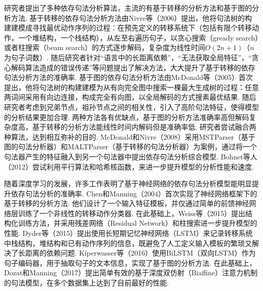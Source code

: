 研究者提出了多种依存句法分析算法，主流的有基于转移的分析方法和基于图的分析方法.
基于转移的依存句法分析方法由Nivre等（2006）提出，他将句法树的构建建模成寻找最优动作序列的过程：在预先定义的转移系统下（包括有限个转移动作，一个堆结构，一个栈结构），从左至右遍历句子，以贪心搜索（gready search）或者柱搜索（beam search）的方式逐步解码，复杂度为线性时间$O(2n+1)$（$n$为句子词数）.
随后研究者针对“语言中的长距离依赖”，“无法获取全局特征”，“贪心解码算法造成的错误传递”等问题提出了解决方法，大大提升了基于转移的依存句法分析方法的准确率.
基于图的依存句法分析方法由McDonald等（2005）首次提出，他将句法树的构建建模为从有向完全图中搜索一棵最大生成树的过程：任意两词间采用有向边连接，构成完全有向图，以全局解码的方式搜素最优结果. 随后研究者考虑到兄弟节点，祖孙节点之间的相关性，引入了高阶句法特征，使得模型的分析结果更加合理.
两种方法各有优缺点，基于图的分析方法准确率高但解码复杂度高，基于转移的分析方法能线性时间内解码但是准确率低. 研究者尝试融合两种算法，达到相互弥补的目的. McDonald和Nivre（2008）采用MSTParser（基于图的句法分析器）和MALTParser（基于转移的句法分析器）为案例，通过将一个句法器产生的特征融入到另一个句法器中提出依存句法分析综合模型. Bohnet等人（2012）尝试利用平行算法和哈希核函数，来进一步提升模型的分析性能和速度.

随着深度学习的发展，许多工作表明了基于神经网络的依存句法分析模型能明显提升依存句法分析的准确率.
Chen和Manning（2004）首次实现了神经网络框架下的基于转移的分析方法. 他们设计了一个输入特征模板，并仅通过简单的前馈神经网络层训练了一个非线性的转移动作分类器. %
在此基础上，Weiss等（2015）提出结构化训练方法，并采用残差网络（Residual Network）和柱搜索进一步提升模型的性能.
Dyder等（2015）提出使用长短期记忆神经网络（LSTM）来记录转移系统中栈结构，堆结构和已有动作序列的信息，既避免了人工定义输入模板的繁琐又解决了长距离的依赖问题.
Kiperwasser等（2016）使用BiLSTM（双向LSTM）作为句子编码器，用于抽取句子的文本信息，实现了基于图的分析方法.
在此基础上，Dozat和Manning（2017）提出简单有效的基于深度双仿射（Biaffine）注意力机制的句法模型，在多个数据集上达到了目前最好的性能.

